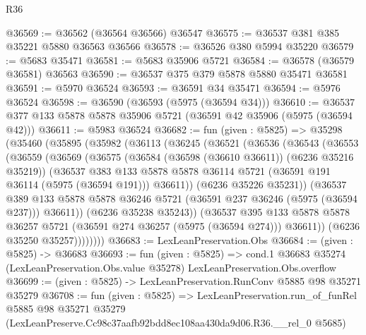 \begin{lexlean}{R36}
\begin{coremodule}
@36569 := @36562 (@36564 @36566) @36547
@36575 := @36537 @381 @385 @35221 @5880 @36563 @36566
@36578 := @36526 @380 @5994 @35220
@36579 := @5683 @35471
@36581 := @5683 @35906 @5721
@36584 := @36578 (@36579 @36581) @36563
@36590 := @36537 @375 @379 @5878 @5880 @35471 @36581
@36591 := @5970 @36524
@36593 := @36591 @34 @35471
@36594 := @5976 @36524
@36598 := @36590 (@36593 (@5975 (@36594 @34)))
@36610 := @36537 @377 @133 @5878 @5878 @35906 @5721 (@36591 @42 @35906 (@5975 (@36594 @42)))
@36611 := @5983 @36524
@36682 := fun (given : @5825) =>
  @35298
    (@35460
      (@35895
        (@35982
          (@36113
            (@36245
              (@36521
                (@36536
                  (@36543
                    (@36553
                      (@36559
                        (@36569
                          (@36575
                            (@36584 (@36598 (@36610 @36611)) (@6236 @35216 @35219))
                            (@36537
                              @383
                              @133
                              @5878
                              @5878
                              @36114
                              @5721
                              (@36591 @191 @36114 (@5975 (@36594 @191)))
                              @36611))
                          (@6236 @35226 @35231))
                        (@36537
                          @389
                          @133
                          @5878
                          @5878
                          @36246
                          @5721
                          (@36591 @237 @36246 (@5975 (@36594 @237)))
                          @36611))
                      (@6236 @35238 @35243))
                    (@36537
                      @395
                      @133
                      @5878
                      @5878
                      @36257
                      @5721
                      (@36591 @274 @36257 (@5975 (@36594 @274)))
                      @36611))
                  (@6236 @35250 @35257))))))))
@36683 := LexLeanPreservation.Obs
@36684 := (given : @5825) -> @36683
@36693 := fun (given : @5825) =>
  cond.{1} @36683 @35274 (LexLeanPreservation.Obs.value @35278) LexLeanPreservation.Obs.overflow
@36699 := (given : @5825) -> LexLeanPreservation.RunConv @5885 @98 @35271 @35279
@36708 := fun (given : @5825) =>
  LexLeanPreservation.run_of_funRel
    @5885
    @98
    @35271
    @35279
    (LexLeanPreserve.Cc98c37aafb92bdd8ec108aa430da9d06.R36.__rel_0 @5685)
\end{coremodule}
\end{lexlean}
